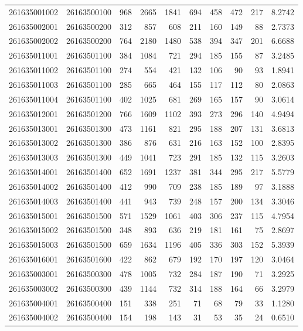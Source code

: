 \documentclass[
  11pt,
]{article}
\begin{document}
\begin{longtable}[t]{llrrrrrrrr}
261635001002 & 26163500100 & 968 & 2665 & 1841 & 694 & 458 & 472 & 217 & 8.2742\\
261635002001 & 26163500200 & 312 & 857 & 608 & 211 & 160 & 149 & 88 & 2.7373\\
261635002002 & 26163500200 & 764 & 2180 & 1480 & 538 & 394 & 347 & 201 & 6.6688\\
261635011001 & 26163501100 & 384 & 1084 & 721 & 294 & 185 & 155 & 87 & 3.2485\\
261635011002 & 26163501100 & 274 & 554 & 421 & 132 & 106 & 90 & 93 & 1.8941\\
261635011003 & 26163501100 & 285 & 665 & 464 & 155 & 117 & 112 & 80 & 2.0863\\
261635011004 & 26163501100 & 402 & 1025 & 681 & 269 & 165 & 157 & 90 & 3.0614\\
261635012001 & 26163501200 & 766 & 1609 & 1102 & 393 & 273 & 296 & 140 & 4.9494\\
261635013001 & 26163501300 & 473 & 1161 & 821 & 295 & 188 & 207 & 131 & 3.6813\\
261635013002 & 26163501300 & 386 & 876 & 631 & 216 & 163 & 152 & 100 & 2.8395\\
261635013003 & 26163501300 & 449 & 1041 & 723 & 291 & 185 & 132 & 115 & 3.2603\\
261635014001 & 26163501400 & 652 & 1691 & 1237 & 381 & 344 & 295 & 217 & 5.5779\\
261635014002 & 26163501400 & 412 & 990 & 709 & 238 & 185 & 189 & 97 & 3.1888\\
261635014003 & 26163501400 & 441 & 943 & 739 & 248 & 157 & 200 & 134 & 3.3046\\
261635015001 & 26163501500 & 571 & 1529 & 1061 & 403 & 306 & 237 & 115 & 4.7954\\
261635015002 & 26163501500 & 348 & 893 & 636 & 219 & 181 & 161 & 75 & 2.8697\\
261635015003 & 26163501500 & 659 & 1634 & 1196 & 405 & 336 & 303 & 152 & 5.3939\\
261635016001 & 26163501600 & 422 & 862 & 679 & 192 & 170 & 197 & 120 & 3.0464\\
261635003001 & 26163500300 & 478 & 1005 & 732 & 284 & 187 & 190 & 71 & 3.2925\\
261635003002 & 26163500300 & 439 & 1144 & 732 & 314 & 188 & 164 & 66 & 3.2979\\
261635004001 & 26163500400 & 151 & 338 & 251 & 71 & 68 & 79 & 33 & 1.1280\\
261635004002 & 26163500400 & 154 & 198 & 143 & 31 & 53 & 35 & 24 & 0.6510\\

\end{longtable}
\end{document}

